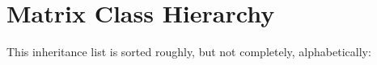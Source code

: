 \section{Matrix Class Hierarchy}
This inheritance list is sorted roughly, but not completely, alphabetically:\begin{CompactList}
\item {}
\item {}
\item {}
\end{CompactList}
